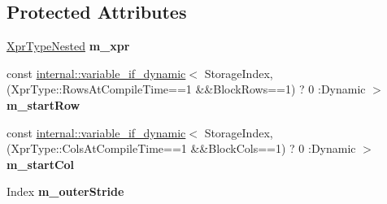 \subsection*{Protected Attributes}
\begin{DoxyCompactItemize}
\item 
\mbox{\label{class_eigen_1_1internal_1_1_block_impl__dense_3_01_xpr_type_00_01_block_rows_00_01_block_cols_00_01_inner_panel_00_01true_01_4_a746d7500a44f0475b2d11ffb0476135b}} 
\mbox{\hyperlink{struct_eigen_1_1internal_1_1true__type}{Xpr\+Type\+Nested}} {\bfseries m\+\_\+xpr}
\item 
\mbox{\label{class_eigen_1_1internal_1_1_block_impl__dense_3_01_xpr_type_00_01_block_rows_00_01_block_cols_00_01_inner_panel_00_01true_01_4_a8980847dbfee6f4a64f705640cb976b6}} 
const \mbox{\hyperlink{class_eigen_1_1internal_1_1variable__if__dynamic}{internal\+::variable\+\_\+if\+\_\+dynamic}}$<$ Storage\+Index,(Xpr\+Type\+::\+Rows\+At\+Compile\+Time==1 \&\&Block\+Rows==1) ? 0 \+:Dynamic $>$ {\bfseries m\+\_\+start\+Row}
\item 
\mbox{\label{class_eigen_1_1internal_1_1_block_impl__dense_3_01_xpr_type_00_01_block_rows_00_01_block_cols_00_01_inner_panel_00_01true_01_4_ade5fdd1437ea358eb0040a07d3f726c5}} 
const \mbox{\hyperlink{class_eigen_1_1internal_1_1variable__if__dynamic}{internal\+::variable\+\_\+if\+\_\+dynamic}}$<$ Storage\+Index,(Xpr\+Type\+::\+Cols\+At\+Compile\+Time==1 \&\&Block\+Cols==1) ? 0 \+:Dynamic $>$ {\bfseries m\+\_\+start\+Col}
\item 
\mbox{\label{class_eigen_1_1internal_1_1_block_impl__dense_3_01_xpr_type_00_01_block_rows_00_01_block_cols_00_01_inner_panel_00_01true_01_4_ae0744034189ad873da698feebfe0a374}} 
Index {\bfseries m\+\_\+outer\+Stride}
\end{DoxyCompactItemize}


